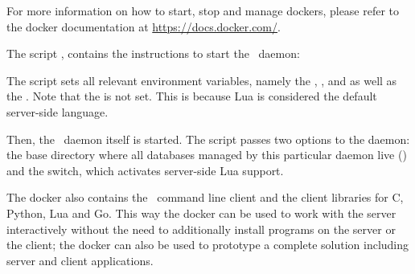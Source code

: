For more information on how to start, stop and manage
dockers, please refer to the docker documentation at
\url{https://docs.docker.com/}.

The script , contains the
instructions to start the \nowdb\ daemon:


The script sets all relevant environment variables,
namely the ,
,
 and 
as well as the .
Note that the  is not set.
This is because Lua is considered the
default server-side language.

Then, the \nowdb\ daemon itself is started.
The script passes two options to the daemon:
the base directory where all databases
managed by this particular daemon live ()
and the  switch, which activates
server-side Lua support.

The docker also contains the \nowdb\ command line client
and the client libraries for C, Python, Lua and Go.
This way the docker can be used to work with the server
interactively without the need to additionally install
programs on the server or the client; the docker can
also be used to prototype a complete solution including
server and client applications.
